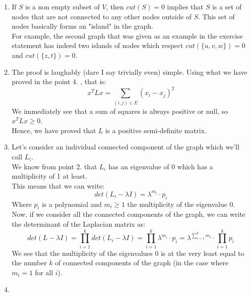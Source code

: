 \documentclass[11pt, legalpaper]{article}
\begin{document}
\begin{enumerate}
            \item If $S$ is a non empty subset of $V$, then $cut(S)=0$ implies that $S$ is a set of nodes that are not connected to any other nodes outside of $S$. This set of nodes basically forms an "island" in the graph. \\
            For example, the second graph that was given as an example in the exercise statement has indeed two islands of nodes which respect $cut(\{u,v,w\})=0$ and $cut(\{z,t\})=0$.

            \item The proof is laughably (dare I say trivially even) simple. Using what we have proved in the point 4. , that is:
            $$x^T L x = \sum_{(i,j)\in E} (x_i-x_j)^2$$
            We immediately see that a sum of squares is always positive or null, so $x^T L x \geq 0$. \\
            Hence, we have proved that $L$ is a positive semi-definite matrix.

            \item Let's consider an individual connected component of the graph which we'll call $L_i$.\\
            We know from point 2. that $L_i$ has an eigenvalue of $0$ which has a multiplicity of 1 at least. \\
            This means that we can write: $$det(L_i-\lambda I)=\lambda^{m_i} \cdot p_i$$ Where $p_i$ is a polynomial and $m_i \geq 1$ the multiplicity of the eigenvalue $0$.\\
            Now, if we consider all the connected components of the graph, we can write the determinant of the Laplacian matrix as:
            $$det(L-\lambda I)=\prod_{i=1}^{k}det(L_i-\lambda I)=\prod_{i=1}^{k}\lambda^{m_i} \cdot p_i=\lambda^{\sum_{i=1}^{k}m_i} \cdot \prod_{i=1}^{k}p_i$$
            We see that the multiplicity of the eigenvalues $0$ is at the very least equal to the number $k$ of connected components of the graph (in the case where $m_i=1$ for all $i$).
            
            \item 
\end{enumerate}
\end{document}
